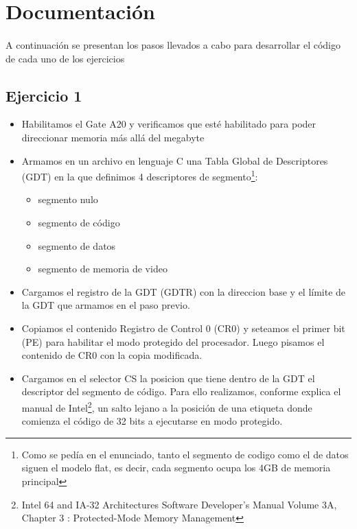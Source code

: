 \section{Documentaci\'on}
\paragraph{}
A continuaci\'on se presentan los pasos llevados a cabo para desarrollar el c\'odigo de cada uno de los ejercicios

\vspace{22pt}

\subsection{Ejercicio 1}
\begin{itemize}
 \item Habilitamos el Gate A20 y verificamos que est\'e habilitado para poder direccionar memoria m\'as all\'a del megabyte
 \item Armamos en un archivo en lenguaje C una Tabla Global de Descriptores (GDT) en la que definimos 4 descriptores de segmento\footnote{Como se ped\'ia en el enunciado, tanto el segmento de codigo como el de datos siguen el modelo flat, es decir, cada segmento ocupa los 4GB de memoria principal}: 
	\begin{itemize}
	\item segmento nulo
	\item segmento de c\'odigo
	\item segmento de datos
	\item segmento de memoria de video
	\end{itemize}

 \item Cargamos el registro de la GDT (GDTR) con la direccion base  y el l\'imite de la GDT que armamos en el paso previo.

 \item Copiamos el contenido Registro de Control 0 (CR0) y seteamos el primer bit (PE) para habilitar el modo protegido del procesador. Luego pisamos el contenido de CR0 con la copia modificada.

 \item Cargamos en el selector CS la posicion que tiene dentro de la GDT el descriptor del segmento de c\'odigo. Para ello realizamos, conforme explica el manual de Intel\footnote{Intel 64 and IA-32 Architectures Software Developer's Manual Volume 3A, Chapter 3 : Protected-Mode Memory Management}, un salto lejano a la posici\'on de una etiqueta donde comienza el c\'odigo de 32 bits a ejecutarse en modo protegido.


\end{itemize}
